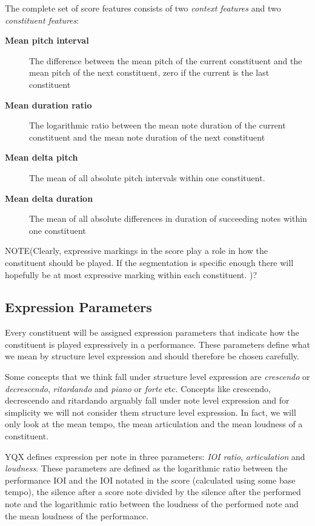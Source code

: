 \documentclass[a4paper,10pt]{article}
\begin{document}
The complete set of score features consists of two \textit{context features} and two \textit{constituent features}:
\begin{description}
\item[\textbf{Mean pitch interval}] 
The difference between the mean pitch of the current constituent and the mean pitch of the next constituent, zero if the current is the last constituent
\item[\textbf{Mean duration ratio}]
The logarithmic ratio between the mean note duration of the current constituent and the mean note duration of the next constituent
\item[\textbf{Mean delta pitch}] The mean of all absolute pitch intervals within one constituent. 
\item[\textbf{Mean delta duration}] The mean of all absolute differences in duration of succeeding notes within one constituent
\end{description}

NOTE(Clearly, expressive markings in the score play a role in how the constituent should be played. If the segmentation is specific enough  there will hopefully be at most expressive marking within each constituent. )?

\subsection{Expression Parameters}
\label{targets}

Every constituent will be assigned expression parameters that indicate how the constituent is played expressively in a performance. These parameters define what we mean by structure level expression and should therefore be chosen carefully. 

Some concepts that we think fall under structure level expression are \textit{crescendo} or \textit{decrescendo}, \textit{ritardando} and \textit{piano} or \textit{forte} etc.
Concepts like crescendo, decrescendo and ritardando arguably fall under note level expression and for simplicity we will not consider them structure level expression. In fact, we will only look at the mean tempo, the mean articulation and the mean loudness of a constituent.

YQX defines expression per note in three parameters: \textit{IOI ratio}, \textit{articulation} and \textit{loudness}. These parameters are defined as the logarithmic ratio between the performance IOI and the IOI notated in the score (calculated using some base tempo), the silence after a score note divided by the silence after the performed note and the logarithmic ratio between the loudness of the performed note and the mean loudness of the performance. 
\end{document}
